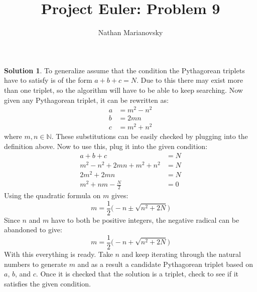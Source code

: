 \documentclass[12pt, letterpaper, onecolumn, conference, final]{IEEEtran}
\title{Project Euler: Problem 9}
\author{Nathan Marianovsky}
\theoremstyle{definition}
\newtheorem*{problem*}{Problem}
\newtheorem*{solution*}{Solution}
\theoremstyle{plain}
\begin{document}
\maketitle

\begin{center}
\end{center}

\vspace{.3cm}
\begin{solution*}
To generalize assume that the condition the Pythagorean triplets have to satisfy is of the form $a + b + c = N$. Due to this there may exist more than one triplet, so the algorithm will have to be able to keep searching. Now given any Pythagorean triplet, it can be rewritten as:
\begin{equation*}
\begin{split}
a &= m^2 - n^2 \\
b &= 2mn \\
c &= m^2 + n^2
\end{split}
\end{equation*}
where $m,n \in \mathbb{N}$. These substitutions can be easily checked by plugging into the definition above. Now to use this, plug it into the given condition:
\begin{equation*}
\begin{split}
a + b + c &= N \\
m^2 - n^2 + 2mn + m^2 + n^2 &= N \\
2m^2 + 2mn &= N \\
m^2 + nm - \frac{N}{2} &= 0
\end{split}
\end{equation*}
Using the quadratic formula on $m$ gives:
\begin{equation*}
m = \frac{1}{2} \Big( -n \pm \sqrt{n^2 + 2N} \Big)
\end{equation*}
Since $n$ and $m$ have to both be positive integers, the negative radical can be abandoned to give:
\begin{equation*}
m = \frac{1}{2} \Big( -n + \sqrt{n^2 + 2N} \Big)
\end{equation*}
With this everything is ready. Take $n$ and keep iterating through the natural numbers to generate $m$ and as a result a candidate Pythagorean triplet based on $a$, $b$, and $c$. Once it is checked that the solution is a triplet, check to see if it satisfies the given condition. 
\end{solution*}
\end{document}
